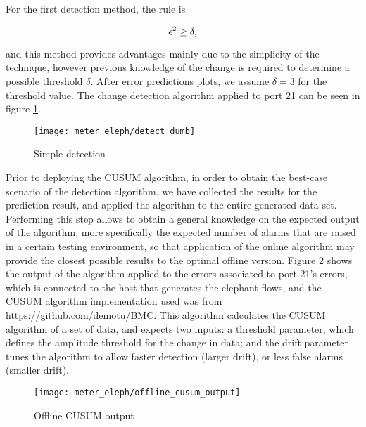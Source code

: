 \par For the first detection method, the rule is 

\begin{equation*}
    \centering
    \label{eq:detection_method}
    \epsilon^2 \geq \delta,
\end{equation*}

\par and this method provides advantages mainly due to the simplicity of the technique, however previous knowledge of the change is required to determine a possible
threshold $\delta$. After error predictions plots, we assume $\delta = 3$ for the threshold value. The change detection algorithm applied to port 21 can be seen 
in figure \ref{fig:detect_dumb}.

\begin{figure}[H]
    \centering
    \texttt{[image: meter\_eleph/detect\_dumb]}
    \caption {Simple detection}
    \label{fig:detect_dumb}
\end{figure} 

\par Prior to deploying the CUSUM algorithm, in order to obtain the best-case scenario of the detection algorithm, we have collected the results for the prediction
result, and applied the algorithm to the entire generated data set. Performing this step allows to obtain a general knowledge on the expected output of the algorithm,
more specifically the expected number of alarms that are raised in a certain testing environment, so that application of the online algorithm may provide the
closest possible results to the optimal offline version. Figure  \ref{fig:offline_cusum} shows the output of the algorithm applied to the errors associated to
port 21's errors, which is connected to the host that generates the elephant flows, and the CUSUM algorithm implementation used was from 
\url{https://github.com/demotu/BMC}. This algorithm calculates the CUSUM algorithm of a set of data, and expects two inputs: a threshold parameter, which defines
the amplitude threshold for the change in data; and the drift parameter tunes the algorithm to allow faster detection (larger drift), or less false alarms (smaller 
drift). 

\begin{figure} [H]
    \centering
    \texttt{[image: meter\_eleph/offline\_cusum\_output]}
    \caption {Offline CUSUM output}
    \label{fig:offline_cusum}
\end{figure} 

